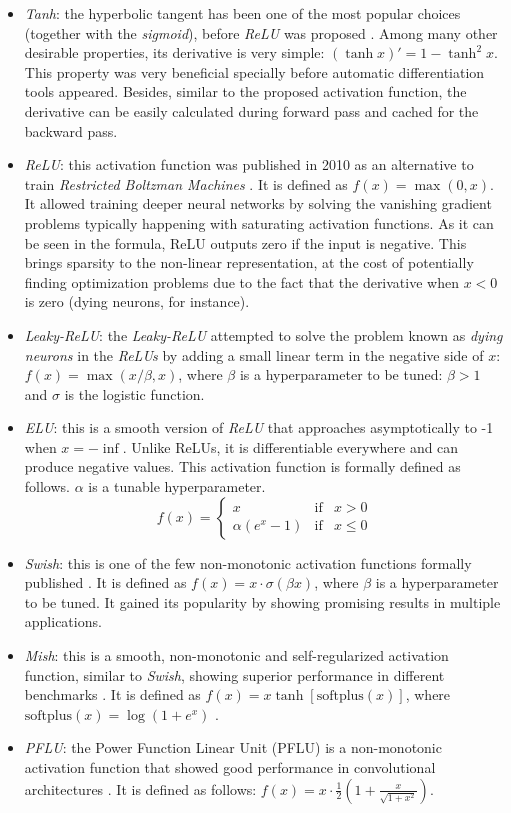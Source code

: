 \begin{itemize}
	\item \textit{Tanh}: the hyperbolic tangent has been one of the most popular choices (together with the \textit{sigmoid}), before \textit{ReLU} was proposed \autocite{lecun2012}. Among many other desirable properties, its derivative is very simple: $(\tanh x)'=1-\tanh^2 x$. This property was very beneficial specially before automatic differentiation tools appeared. Besides, similar to the proposed activation function, the derivative can be easily calculated during forward pass and cached for the backward pass.
	\item \textit{ReLU}: this activation function was published in 2010 as an alternative to train \textit{Restricted Boltzman Machines} \autocite{nair2010}. It is defined as $f(x) = \max(0,x)$. It allowed training deeper neural networks by solving the vanishing gradient problems typically happening with saturating activation functions. As it can be seen in the formula, ReLU outputs zero if the input is negative. This brings sparsity to the non-linear representation, at the cost of potentially finding optimization problems due to the fact that the derivative when $x<0$ is zero (dying neurons, for instance).
	\item \textit{Leaky-ReLU}: the \textit{Leaky-ReLU} \autocite{xu2015} attempted to solve the problem known as \textit{dying neurons} in the \textit{ReLUs} by adding a small linear term in the negative side of $x$: $f(x) = \max(x/\beta, x)$, where $\beta$ is a hyperparameter to be tuned: $\beta>1$ and $\sigma$ is the logistic function.
	\item \textit{ELU}: this is a smooth version of \textit{ReLU} \autocite{djork2016} that approaches asymptotically to -1 when $x=-\inf$. Unlike ReLUs, it is differentiable everywhere and can produce negative values. This activation function is formally defined as follows. $\alpha$ is a tunable hyperparameter.
	$$
	f(x)= \left\{ \begin{array}{lcc}
		x &   \text{if}  & x > 0 \\
 \alpha(e^x - 1) &  \text{if} & x \leq 0
	\end{array}
	\right.
	$$

	\item \textit{Swish}: this is one of the few non-monotonic activation functions formally published \autocite{ramachandran2018}. It is defined as $f(x) = x \cdot \sigma(\beta x)$, where $\beta$ is a hyperparameter to be tuned. It gained its popularity by showing promising results in multiple applications. 
	\item \textit{Mish}: this is a smooth, non-monotonic and self-regularized activation function, similar to \textit{Swish}, showing superior performance in different benchmarks \autocite{misra2019mish}. It is defined as $f(x) = x \tanh \left[\text{softplus} (x)\right]$, where $\text{softplus} (x) = \log(1+e^x)$ \autocite{dugas2001}.
	\item \textit{PFLU}: the Power Function Linear Unit (PFLU) is a non-monotonic activation function that showed good performance in convolutional architectures \autocite{zhu2020}. It is defined as follows: $f(x) = x \cdot \frac{1}{2} \left( 1 + \frac{x}{\sqrt{1+x^2}} \right)$.


\end{itemize}
